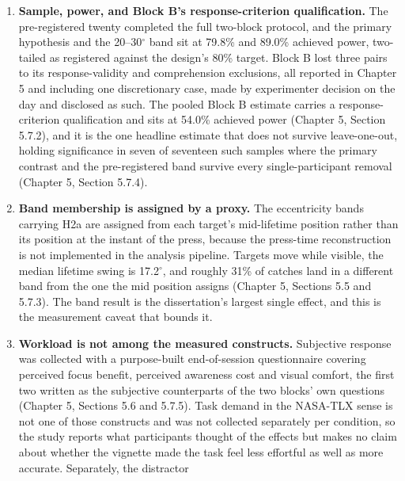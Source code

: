 \begin{enumerate}
  eccentricities used \citep{higgins2022,sitzmann2018}, but covert attention shifts, distraction
  without head movement, are invisible to telemetry. The dependent variables were chosen so that
  \textit{performance outcomes} rather than attention allocation carry the hypotheses, so the
  mechanism remains partially inferred.
\item \textbf{Sample, power, and Block B's response-criterion qualification.} The pre-registered
  twenty completed
  the full two-block protocol, and the primary hypothesis and the 20--30$^{\circ}$ band sit at 79.8\%
  and 89.0\% achieved power, two-tailed as registered against the design's 80\% target. Block B lost three
  pairs to its response-validity and comprehension exclusions, all reported in Chapter 5 and
  including one discretionary case, made by experimenter decision on the day and disclosed as such.
  The pooled Block B
  estimate carries a response-criterion qualification and sits at 54.0\% achieved power (Chapter 5,
  Section 5.7.2), and it is the one headline estimate that does not survive leave-one-out, holding
  significance in seven of seventeen such samples where the primary contrast and the pre-registered
  band survive every single-participant removal (Chapter 5, Section 5.7.4).
\item \textbf{Band membership is assigned by a proxy.} The eccentricity bands carrying H2a are
  assigned from each target's mid-lifetime position rather than its position at the instant of the
  press, because the press-time reconstruction is not implemented in the analysis pipeline. Targets
  move while visible, the median lifetime swing is 17.2$^{\circ}$, and roughly 31\% of catches land
  in a different band from the one the mid position assigns (Chapter 5, Sections 5.5 and 5.7.3).
  The band result is the dissertation's largest single effect, and this is the measurement caveat
  that bounds it.
\item \textbf{Workload is not among the measured constructs.} Subjective response was collected
  with a purpose-built end-of-session questionnaire covering perceived focus benefit, perceived
  awareness cost and visual comfort, the first two written as the subjective counterparts of the two
  blocks' own questions (Chapter 5, Sections 5.6 and 5.7.5). Task demand in the
  NASA-TLX sense is not one of those constructs and was not collected separately per condition, so
  the study reports what participants thought of the effects but makes no claim about whether the
  vignette made the task feel less effortful as well as more accurate. Separately, the distractor

\end{enumerate}
